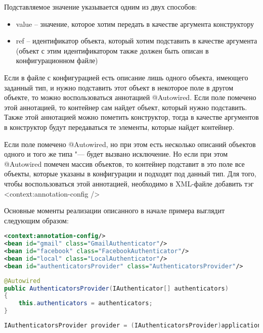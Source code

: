 Подставляемое значение указывается одним из двух способов:
\begin{itemize}
	\item value – значение, которое хотим передать в качестве аргумента конструктору
	\item ref – идентификатор объекта, который хотим подставить в качестве аргумента (объект с этим идентификатором также должен быть описан в конфигурационном файле)
\end{itemize}

Если в файле с конфигурацией есть описание лишь одного объекта, имеющего заданный тип, и нужно подставить этот объект в некоторое поле в другом объекте, то можно воспользоваться 
аннотацией @Autowired. Если поле помечено этой аннотацией, то контейнер сам найдет объект, который нужно подставить. Также этой аннотацией можно пометить конструктор, тогда в 
качестве аргументов в конструктор будут передаваться те элементы, которые найдет контейнер. 

Если поле помечено @Autowired, но при этом есть несколько описаний объектов одного и того же типа "--- будет вызвано исключение. 
Но если при этом @Autowired помечен массив объектов, то контейнер подставит в это поле все объекты, которые указаны в конфигурации и подходят под данный тип. 
Для того, чтобы воспользоваться этой аннотацией, необходимо в XML-файле добавить тэг <context:annotation-config />

Основные моменты реализации описанного в начале примера выглядит следующим образом:

\begin{lstlisting}[language=XML,caption={Файл конфигурации (без стандартных заголовков)}]
<context:annotation-config/>
<bean id="gmail" class="GmailAuthenticator"/>
<bean id="facebook" class="FacebookAuthenticator"/>
<bean id="local" class="LocalAuthenticator"/>
<bean id="authenticatorsProvider" class="AuthenticatorsProvider"/>
\end{lstlisting}

\begin{lstlisting}[language=Java,caption={Конструктор класса AuthenticatorsProvider}]
@Autowired
public AuthenticatorsProvider(IAuthenticator[] authenticators)
{
	this.authenticators = authenticators;
}
\end{lstlisting}

\begin{lstlisting}[language=Java,caption={Место получения экземпляра}]
IAuthenticatorsProvider provider = (IAuthenticatorsProvider)applicationContext.getBean("authenticatorsProvider");
\end{lstlisting}

